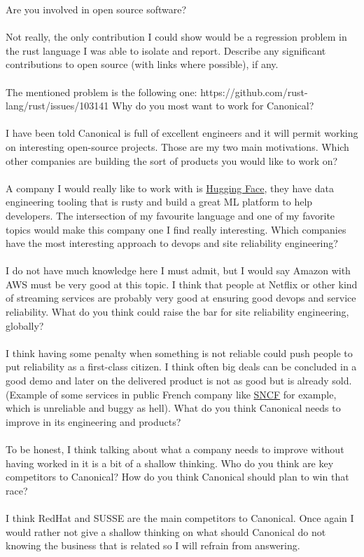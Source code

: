 \documentclass{exam}
\begin{document}
\begin{questions}

\question Are you involved in open source software?
\\~\\
Not really, the only contribution I could show would be a regression problem in the rust language I was able to isolate and report.
\question Describe any significant contributions to open source (with links where possible), if any.
\\~\\
The mentioned problem is the following one:
https://github.com/rust-lang/rust/issues/103141
\question Why do you most want to work for Canonical?
\\~\\
I have been told Canonical is full of excellent engineers and it will permit working on interesting open-source projects. Those are my two main motivations.
\question Which other companies are building the sort of products you would like to work on?
\\~\\
A company I would really like to work with is \href{https://huggingface.co/}{Hugging Face}, they have data engineering tooling that is 
rusty and build a great ML platform to help developers. The intersection of my favourite language and one of my favorite topics would make this company one I find really interesting.
\question Which companies have the most interesting approach to devops and site reliability engineering?
\\~\\
I do not have much knowledge here I must admit, but I would say Amazon with AWS must be very good at this topic. 
I think that people at Netflix or other kind of streaming services are probably very good at ensuring good devops and service reliability.
\question What do you think could raise the bar for site reliability engineering, globally?
\\~\\
I think having some penalty when something is not reliable could push people to put reliability as a first-class citizen.
I think often big deals can be concluded in a good demo and later on the delivered product is not as good but is already sold.
(Example of some services in public French company like \href{https://www.sncf.com/fr}{SNCF} for example, which is unreliable and buggy as hell).
\question What do you think Canonical needs to improve in its engineering and products?
\\~\\
To be honest, I think talking about what a company needs to improve without having worked in it is a bit of a shallow thinking.
\question Who do you think are key competitors to Canonical? How do you think Canonical should plan to win that race?
\\~\\
I think RedHat and SUSSE are the main competitors to Canonical.
Once again I would rather not give a shallow thinking on what should Canonical do not knowing the business that is related so I will refrain from answering.
\end{questions}
\end{document}
